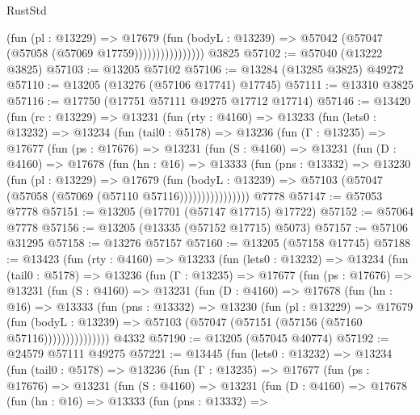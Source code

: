\begin{lexlean}{RustStd}
\begin{coremodule}
                          (fun (pl : @13229) =>
                          @17679
                            (fun (bodyL : @13239) =>
                            @57042 (@57047 (@57058 (@57069 @17759))))))))))))))))
    @3825
@57102 := @57040 (@13222 @3825)
@57103 := @13205 @57102
@57106 := @13284 (@13285 @3825) @49272
@57110 := @13205 (@13276 (@57106 @17741) @17745)
@57111 := @13310 @3825
@57116 := @17750 (@17751 @57111 @49275 @17712 @17714)
@57146 := @13420
    (fun (rc : @13229) =>
    @13231
      (fun (rty : @4160) =>
      @13233
        (fun (lets0 : @13232) =>
        @13234
          (fun (tail0 : @5178) =>
          @13236
            (fun (Γ : @13235) =>
            @17677
              (fun (ps : @17676) =>
              @13231
                (fun (S : @4160) =>
                @13231
                  (fun (D : @4160) =>
                  @17678
                    (fun (hn : @16) =>
                    @13333
                      (fun (pns : @13332) =>
                      @13230
                        (fun (pl : @13229) =>
                        @17679
                          (fun (bodyL : @13239) =>
                          @57103 (@57047 (@57058 (@57069 (@57110 @57116))))))))))))))))
    @7778
@57147 := @57053 @7778
@57151 := @13205 (@17701 (@57147 @17715) @17722)
@57152 := @57064 @7778
@57156 := @13205 (@13335 (@57152 @17715) @5073)
@57157 := @57106 @31295
@57158 := @13276 @57157
@57160 := @13205 (@57158 @17745)
@57188 := @13423
    (fun (rty : @4160) =>
    @13233
      (fun (lets0 : @13232) =>
      @13234
        (fun (tail0 : @5178) =>
        @13236
          (fun (Γ : @13235) =>
          @17677
            (fun (ps : @17676) =>
            @13231
              (fun (S : @4160) =>
              @13231
                (fun (D : @4160) =>
                @17678
                  (fun (hn : @16) =>
                  @13333
                    (fun (pns : @13332) =>
                    @13230
                      (fun (pl : @13229) =>
                      @17679
                        (fun (bodyL : @13239) =>
                        @57103 (@57047 (@57151 (@57156 (@57160 @57116)))))))))))))))
    @4332
@57190 := @13205 (@57045 @40774)
@57192 := @24579 @57111 @49275
@57221 := @13445
    (fun (lets0 : @13232) =>
    @13234
      (fun (tail0 : @5178) =>
      @13236
        (fun (Γ : @13235) =>
        @17677
          (fun (ps : @17676) =>
          @13231
            (fun (S : @4160) =>
            @13231
              (fun (D : @4160) =>
              @17678
                (fun (hn : @16) =>
                @13333
                  (fun (pns : @13332) =>

\end{coremodule}
\end{lexlean}

